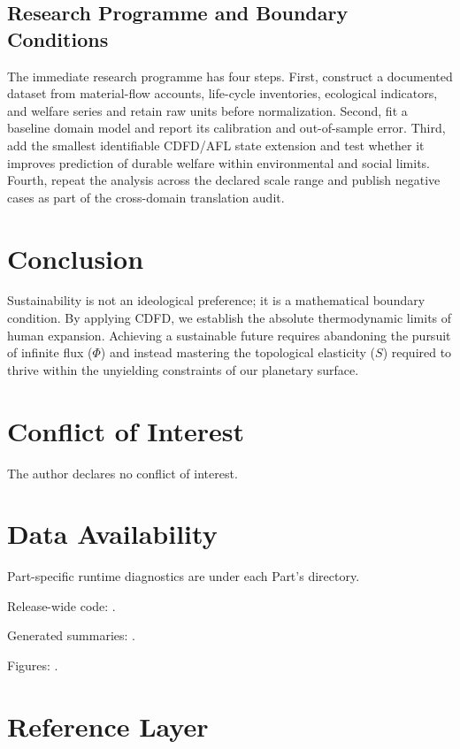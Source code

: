\documentclass[11pt,a4paper]{article}
\begin{document}
\subsection{Research Programme and Boundary Conditions}

The immediate research programme has four steps. First, construct a documented
dataset from material-flow accounts, life-cycle inventories, ecological indicators, and welfare series and retain raw units before normalization.
Second, fit a baseline domain model and report its calibration and out-of-sample
error. Third, add the smallest identifiable CDFD/AFL state extension and test
whether it improves prediction of durable welfare within environmental and social limits. Fourth, repeat the
analysis across the declared scale range and publish negative cases as part of
the cross-domain translation audit.


\section{Conclusion}
Sustainability is not an ideological preference; it is a mathematical boundary condition. By applying CDFD, we establish the absolute thermodynamic limits of human expansion. Achieving a sustainable future requires abandoning the pursuit of infinite flux ($\Phi$) and instead mastering the topological elasticity ($S$) required to thrive within the unyielding constraints of our planetary surface.
\section*{Conflict of Interest} The author declares no conflict of interest.
\section*{Data Availability}
Part-specific runtime diagnostics are under each Part's  directory.

Release-wide code: .

Generated summaries: .

Figures: .


\section{Reference Layer}


\end{document}
